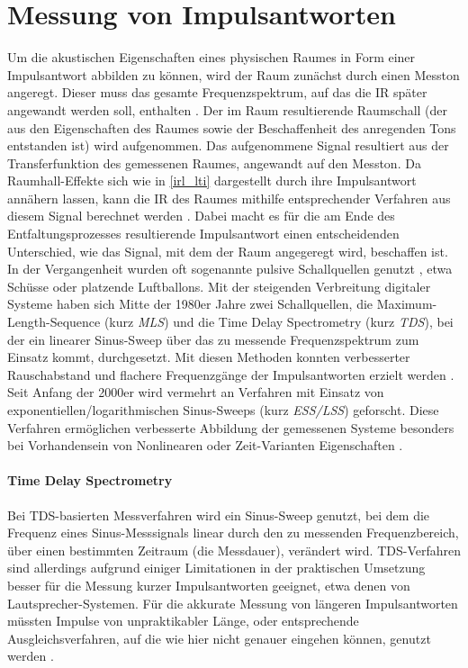 \section{Messung von Impulsantworten} \label{ir_msrmt}
Um die akustischen Eigenschaften eines physischen Raumes in Form einer Impulsantwort abbilden zu können, wird der Raum
zunächst durch einen Messton angeregt. Dieser muss das gesamte Frequenzspektrum, auf das die IR später angewandt werden soll, enthalten \cite{smpm2001}.
Der im Raum resultierende Raumschall (der aus den Eigenschaften des Raumes sowie der Beschaffenheit
des anregenden Tons entstanden ist) wird aufgenommen. Das aufgenommene Signal resultiert aus der Transferfunktion des gemessenen Raumes,
angewandt auf den Messton. Da Raumhall-Effekte sich wie in \ref{irl_lti} dargestellt durch ihre Impulsantwort annähern lassen, kann die IR des Raumes
mithilfe entsprechender Verfahren aus diesem Signal berechnet werden \cite{novak2016}. Dabei macht es für die am Ende des Entfaltungsprozesses resultierende Impulsantwort
einen entscheidenden Unterschied, wie das Signal, mit dem der Raum angegeregt wird, beschaffen ist. In der Vergangenheit wurden oft sogenannte
pulsive Schallquellen genutzt \cite{farina2007b}, etwa Schüsse oder platzende Luftballons. Mit der steigenden Verbreitung digitaler Systeme
haben sich Mitte der 1980er Jahre zwei Schallquellen, die Maximum-Length-Sequence (kurz \textit{MLS}) und die Time Delay Spectrometry (kurz \textit{TDS}),
bei der ein linearer Sinus-Sweep über das zu messende Frequenzspektrum zum Einsatz kommt, durchgesetzt. Mit diesen Methoden konnten
verbesserter Rauschabstand und flachere Frequenzgänge der Impulsantworten erzielt werden \cite{farina2007b}. Seit Anfang der 2000er wird vermehrt
an Verfahren mit Einsatz von exponentiellen/logarithmischen Sinus-Sweeps (kurz \textit{ESS/LSS}) geforscht.
Diese Verfahren ermöglichen verbesserte Abbildung der gemessenen Systeme besonders bei Vorhandensein von Nonlinearen oder Zeit-Varianten Eigenschaften \cite{farina2007b}.

\paragraph{Time Delay Spectrometry}
Bei TDS-basierten Messverfahren wird ein Sinus-Sweep genutzt, bei dem die Frequenz eines Sinus-Messsignals linear durch den zu messenden
Frequenzbereich, über einen bestimmten Zeitraum (die Messdauer), verändert wird. TDS-Verfahren sind allerdings aufgrund einiger Limitationen
in der praktischen Umsetzung besser für die Messung kurzer Impulsantworten geeignet, etwa denen von Lautsprecher-Systemen. Für die akkurate
Messung von längeren Impulsantworten müssten Impulse von unpraktikabler Länge, oder entsprechende Ausgleichsverfahren, auf die
wie hier nicht genauer eingehen können, genutzt werden \cite{farina2000, holters2009}. 
